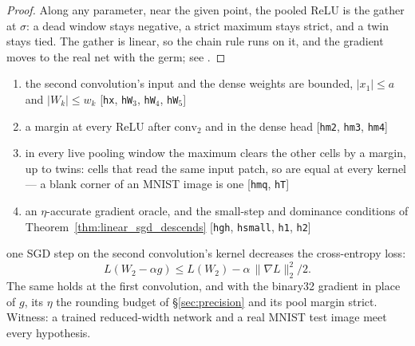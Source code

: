 \begin{proof}
\leanok
Along any parameter, near the given point, the pooled ReLU is the gather
at \(\sigma\): a dead window stays negative, a strict maximum stays strict,
and a twin stays tied. The gather is linear, so the chain rule runs on it,
and the gradient moves to the real net with the germ; see
.
\end{proof}

\begin{theorem}
  \label{thm:cnn_sgd_descends}
  \leanok
  \Assume{}
  \begin{enumerate}
    \item the second convolution's input and the dense weights are bounded,
          \(|x_1| \le a\) and \(|W_k| \le w_k\)
          \hfill[\texttt{hx}, \texttt{hW\(_3\)}, \texttt{hW\(_4\)}, \texttt{hW\(_5\)}]
    \item a margin at every ReLU after \(\mathrm{conv}_2\) and in the dense
          head \hfill[\texttt{hm2}, \texttt{hm3}, \texttt{hm4}]
    \item in every live pooling window the maximum clears the other cells by
          a margin, up to twins: cells that read the same input patch, so are
          equal at every kernel --- a blank corner of an MNIST image is one
          \hfill[\texttt{hmq}, \texttt{hT}]
    \item an \(\eta\)-accurate gradient oracle, and the small-step and
          dominance conditions of Theorem~\ref{thm:linear_sgd_descends}
          \hfill[\texttt{hgh}, \texttt{hsmall}, \texttt{h1}, \texttt{h2}]
  \end{enumerate}
  \Prove{} one SGD step on the second convolution's kernel decreases the
  cross-entropy loss:
  \[
    L(W_2 - \alpha g) \le L(W_2) - \alpha\,\|\nabla L\|_2^2/2 .
  \]
  The same holds at the first convolution, and with the binary32 gradient in
  place of \(g\), its \(\eta\) the rounding budget of \S\ref{sec:precision}
  and its pool margin strict. Witness: a trained reduced-width network and a
  real MNIST test image meet every hypothesis.
\end{theorem}

